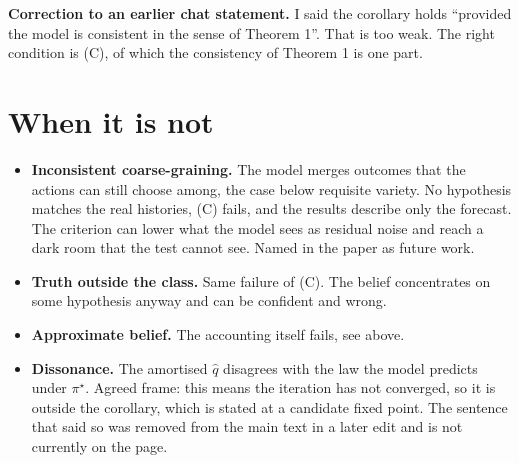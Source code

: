 \documentclass[10pt]{article}
\begin{document}
\textbf{Correction to an earlier chat statement.}
I said the corollary holds ``provided the model is consistent in the sense of Theorem 1''.
That is too weak.
The right condition is (C), of which the consistency of Theorem 1 is one part.

\section{When it is not}
\begin{itemize}
  \item \textbf{Inconsistent coarse-graining.} The model merges outcomes that the actions can still choose among, the case below requisite variety. No hypothesis matches the real histories, (C) fails, and the results describe only the forecast. The criterion can lower what the model sees as residual noise and reach a dark room that the test cannot see. Named in the paper as future work.
  \item \textbf{Truth outside the class.} Same failure of (C). The belief concentrates on some hypothesis anyway and can be confident and wrong.
  \item \textbf{Approximate belief.} The accounting itself fails, see above.
  \item \textbf{Dissonance.} The amortised $\hat q$ disagrees with the law the model predicts under $\pi^\star$. Agreed frame: this means the iteration has not converged, so it is outside the corollary, which is stated at a candidate fixed point. The sentence that said so was removed from the main text in a later edit and is not currently on the page.
\end{itemize}
\end{document}
